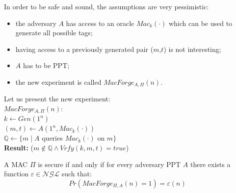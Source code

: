 \documentclass[../main]{subfiles}
\begin{document}
\noindent
In order to be safe and sound, the assumptions are very pessimistic:
\begin{itemize}
    \item the adversary $A$ has access to an oracle $Mac_k(\cdot)$ which can be used to generate all possible tags;
    \item having access to a previously generated pair ($m$,$t$) is not interesting;
    \item $A$ has to be PPT;
    \item the new experiment is called $MacForge_{A,\Pi}(n)$.
\end{itemize}

\noindent
Let us present the new experiment:\\
$MacForge_{A,\Pi}(n):$\\
$k \leftarrow{} Gen(1^n)$\\
$(m,t) \leftarrow{} A(1^n,Mac_k(\cdot))$\\
$\mathbb{Q} \leftarrow{} \{m \; | \; A$ queries $Mac_k(\cdot)$ on $m\}$\\
\textbf{Result:} ($m \notin{\mathbb{Q}} \wedge{} Vrfy(k,m,t) = true$)

\begin{definition}
    A MAC $\Pi$ is secure if and only if for every adversary PPT $A$ there exists a function $\varepsilon{} \in{} \mathcal{NGL}$ such that:
    $$Pr(MacForge_{\Pi,A}(n) = 1) = \varepsilon(n)$$
\end{definition}
\end{document}
